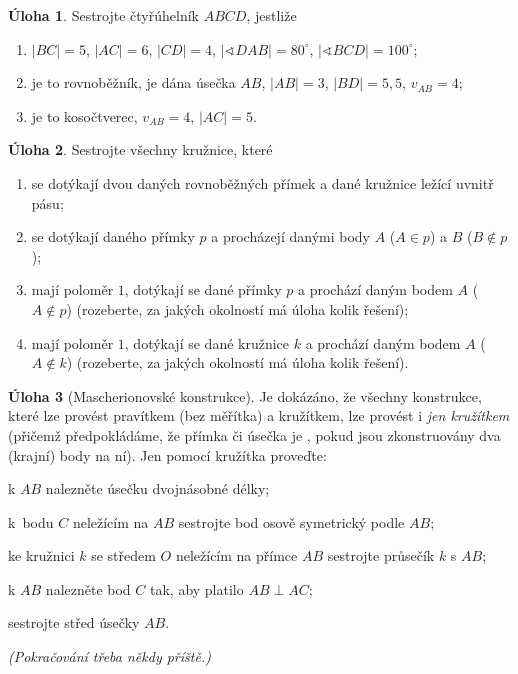 \documentclass[9pt,a5paper]{extarticle}
\theoremstyle{definition}
\newtheorem{uloha}{Úloha}
\newtheorem{suloha}[uloha]{\llap{$\star$ }Úloha}
\newtheorem{ssuloha}[uloha]{\llap{$\star\star$ }Úloha}
\begin{document}
\begin{uloha}
Sestrojte čtyřúhelník $ABCD$, jestliže
\begin{enumerate}
    \item $|BC|=5$, $|AC|=6$, $|CD|=4$, $|\sphericalangle DAB|=80^\circ$, $|\sphericalangle BCD|=100^\circ$; %
    \item je to rovnoběžník, je dána úsečka $AB$, $|AB| = 3$, $|BD| = 5{,}5$, $v_{AB} = 4$; %
    \item je to kosočtverec, $v_{AB}=4$, $|AC|=5$. %
\end{enumerate}
\end{uloha}

\begin{suloha}
Sestrojte všechny kružnice, které
\begin{enumerate}
    \item se dotýkají dvou daných rovnoběžných přímek a dané kružnice ležící uvnitř pásu;
    \item se dotýkají daného přímky $p$ a procházejí danými body $A$ ($A \in p$) a $B$ ($B \notin p$);
    \item mají poloměr $1$, dotýkají se dané přímky $p$ a prochází daným bodem $A$ ($A \notin p$) (rozeberte, za jakých okolností má úloha kolik řešení);
    \item mají poloměr $1$, dotýkají se dané kružnice $k$ a prochází daným bodem $A$ ($A \notin k$) (rozeberte, za jakých okolností má úloha kolik řešení).
\end{enumerate}
\end{suloha}

\begin{ssuloha}[Mascherionovské konstrukce] %
Je dokázáno, že všechny konstrukce, které lze provést pravítkem (bez měřítka) a kružítkem, lze provést i \emph{jen kružítkem} (přičemž předpokládáme, že přímka či úsečka je , pokud jsou zkonstruovány dva (krajní) body na ní). Jen pomocí kružítka proveďte: \begin{enumerate*}
\item k $AB$ nalezněte úsečku dvojnásobné délky;
\item k~bodu $C$ neležícím na $AB$ sestrojte bod osově symetrický podle $AB$;
\item ke kružnici $k$ se středem $O$ neležícím na přímce $AB$ sestrojte průsečík $k$ s $AB$;
\item k $AB$ nalezněte bod $C$ tak, aby platilo $AB \perp AC$;
\item sestrojte střed úsečky $AB$.
\end{enumerate*}\quad
\emph{(Pokračování třeba někdy příště.)}
\end{ssuloha}
\end{document}
